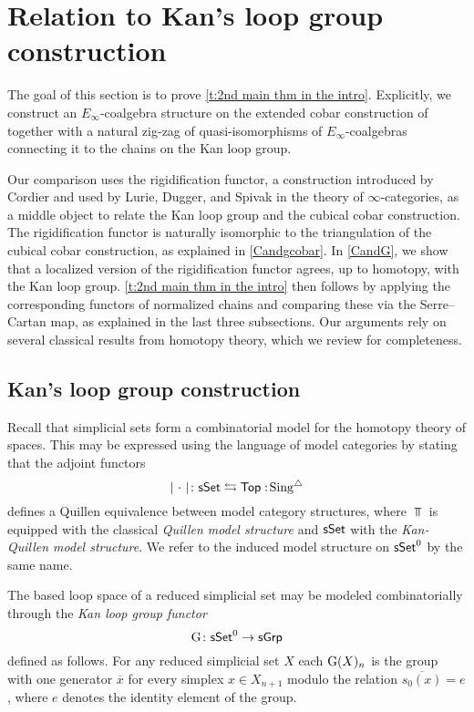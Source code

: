 
\section{Relation to Kan's loop group construction} \label{s:theorem2}

The goal of this section is to prove \cref{t:2nd main thm in the intro}.
Explicitly, we construct an $E_{\infty}$-coalgebra structure on the extended cobar construction of \cite{hess2010cobar} together with a natural zig-zag of quasi-isomorphisms of $E_{\infty}$-coalgebras connecting it to the chains on the Kan loop group.

Our comparison uses the rigidification functor, a construction introduced by Cordier and used by Lurie, Dugger, and Spivak in the theory of $\infty$-categories, as a middle object to relate the Kan loop group and the cubical cobar construction.
The rigidification functor is naturally isomorphic to the triangulation of the cubical cobar construction, as explained in \cref{Candgcobar}.
In \cref{CandG}, we show that a localized version of the rigidification functor agrees, up to homotopy, with the Kan loop group.
\cref{t:2nd main thm in the intro} then follows by applying the corresponding functors of normalized chains and comparing these via the Serre--Cartan map, as explained in the last three subsections.
Our arguments rely on several classical results from homotopy theory, which we review for completeness.

\subsection{Kan's loop group construction}

Recall that simplicial sets form a combinatorial model for the homotopy theory of spaces.
This may be expressed using the language of model categories by stating that the adjoint functors
\[
\lvert\ \cdot\ \rvert \colon \mathsf{sSet} \leftrightarrows \mathsf{Top} :\! \operatorname{Sing^{\triangle}}
\]
defines a Quillen equivalence between model category structures, where $\Top$ is equipped with the classical \textit{Quillen model structure} and $\mathsf{sSet}$ with the \textit{Kan-Quillen model structure}.
We refer to the induced model structure on $\mathsf{sSet}^0$ by the same name.

The based loop space of a reduced simplicial set may be modeled combinatorially through the \textit{Kan loop group functor}
\[
\operatorname{G} \colon \mathsf{sSet}^0 \to \mathsf{sGrp}
\]
defined as follows.
For any reduced simplicial set $X$ each $\operatorname{G}(X)_n$ is the group with one generator $\overline{x}$ for every simplex $x \in X_{n+1}$ modulo the relation $\overline{s_0(x)} = e$, where $e$ denotes the identity element of the group.

